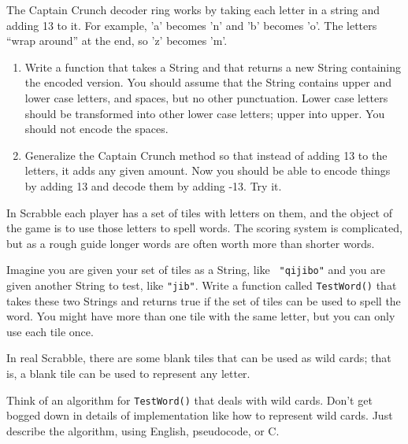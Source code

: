 
\begin{exercise}

The Captain Crunch decoder ring works by taking each letter in a
string and adding 13 to it.  For example, 'a' becomes 'n' and 'b'
becomes 'o'.  The letters ``wrap around'' at the end, so 'z' becomes
'm'.

\begin{enumerate}
\item  Write a function that takes a String and that returns a new String
containing the encoded version.  You should assume that the String
contains upper and lower case letters, and spaces, but no other
punctuation.  Lower case letters should be transformed into other lower
case letters; upper into upper.  You should not encode the spaces.

\item Generalize the Captain Crunch method so that instead of adding
13 to the letters, it adds any given amount.  Now you should be able
to encode things by adding 13 and decode them by adding -13.  Try it.

\end{enumerate}
\end{exercise}



\begin{exercise}
In Scrabble each player has a set of tiles with letters on them, and
the object of the game is to use those letters to spell words.  The
scoring system is complicated, but as a rough guide longer words are
often worth more than shorter words.

Imagine you are given your set of tiles as a String, like {\tt
"qijibo"} and you are given another String to test, like {\tt "jib"}.
Write a function called {\tt TestWord()} that takes these two Strings and
returns true if the set of tiles can be used to spell the word.  You
might have more than one tile with the same letter, but you can only
use each tile once.
\end{exercise}






\begin{exercise}
In real Scrabble, there are some blank tiles that can be used
as wild cards; that is, a blank tile can be used to represent
any letter.

Think of an algorithm for {\tt TestWord()} that deals with wild
cards.  Don't get bogged down in details of implementation like
how to represent wild cards.  Just describe the algorithm, using
English, pseudocode, or C.
\end{exercise}




